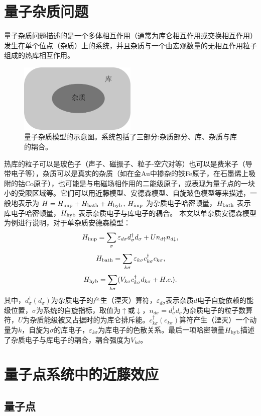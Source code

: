 \documentclass[twoside]{LZUthesis}
\begin{document}
\section{量子杂质问题}
量子杂质问题描述的是一个多体相互作用（通常为库仑相互作用或交换相互作用）发生在单个位点（杂质）上的系统，并且杂质与一个由宏观数量的无相互作用粒子组成的热库相互作用。
\begin{figure}[!hb]
\centering
\includegraphics[width=0.5\textwidth]{QIM.png}
\caption{量子杂质模型的示意图。系统包括了三部分:杂质部分、库、杂质与库的耦合。}
\end{figure}
热库的粒子可以是玻色子（声子、磁振子、粒子-空穴对等）也可以是费米子（导带电子等），杂质可以是真实的杂质（如在金Au中掺杂的铁Fe原子，在石墨烯上吸附的钴Co原子），也可能是与电磁场相作用的二能级原子，或表现为量子点的一块小的受限区域等。它们可以用近藤模型、安德森模型、自旋玻色模型等来描述，一般地表示为 $H = H_{\rm{imp}} + H_{\rm{bath}} + H_{\rm{hyb}}$, $H_{\rm{imp}}$ 为杂质电子哈密顿量，$H_{\rm{bath}}$ 表示库电子哈密顿量，$H_{\rm{hyb}}$ 表示杂质电子与库电子的耦合。
本文以单杂质安德森模型为例进行说明，对于单杂质安德森模型：
\[
H_{\rm{imp}} = \sum_{\sigma} \varepsilon_{d\sigma}d^{\dag}_{\sigma}d_{\sigma} + Un_{d\uparrow}n_{d\downarrow},
\]
\[
H_{\rm{bath}} = \sum_{k\sigma}\varepsilon_{k\sigma}c^{\dag}_{k\sigma}c_{k\sigma},
\]
\[
H_{\rm{hyb}} = \sum_{k\sigma}(V_{k\sigma}c^{\dag}_{k\sigma}d_{k\sigma} + H.c.).
\]
其中，$d^{\dag}_{\sigma}(d_{\sigma})$为杂质电子的产生（湮灭）算符，$\varepsilon_{d\sigma}$表示杂质$d$电子自旋依赖的能级位置，$\sigma$为系统的自旋指标，取值为$\uparrow$或$\downarrow$，$n_{d\sigma}=d^{\dag}_{\sigma}d_{\sigma}$为杂质电子的粒子数算符，$U$为杂质能级被又占据时的为库仑排斥能。$c^{\dag}_{k\sigma}(c_{k\sigma})$算符产生（湮灭）一个动量为$k$，自旋为$\sigma$的库电子，$\varepsilon_{k\sigma}$为库电子的色散关系。最后一项哈密顿量$H_{\rm{hyb}}$描述了杂质电子与库电子的耦合，耦合强度为$V_{kd}$。
\section{量子点系统中的近藤效应}
\subsection{量子点}
\end{document}
